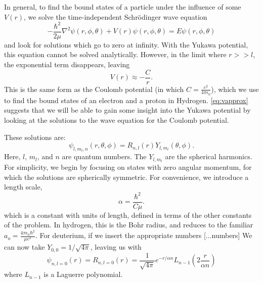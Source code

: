 \documentclass[12pt,twoside]{reedthesis}
\newcommand{\eqn}[1]{\begin{equation}#1\end{equation}}
\begin{document}
In general, to find the bound states of a particle under the influence of some $V(r)$, we solve the time-independent Schr\"odinger wave equation
\eqn{
-\frac{\hbar^2}{2\mu}\nabla^2\psi(r,\phi,\theta) + V(r)\psi (r,\phi,\theta) = E \psi(r,\phi,\theta)
\label{eq:TIDSWE-general}
} and look for solutions which go to zero at infinity.
With the Yukawa potential, this equation cannot be solved analytically. However, in the limit where $r >> l$, the exponential term disappears, leaving
\eqn{
V(r) \approx -\frac{C}{r}\mbox{.}
\label{eq:vapprox}
}
This is the same form as the Coulomb potential (in which $C = \frac{e^2}{4\pi\epsilon_0}$), which we use to find the bound states of an electron and a proton in Hydrogen. \eqref{eq:vapprox} suggests that we will be able to gain some insight into the Yukawa potential by looking at the solutions to the wave equation for the Coulomb potential. 

These solutions are:
\eqn{
\psi_{l, m_l, n} (r, \theta, \phi) = R_{n,l}(r) Y_{l,m_l}(\theta,\phi)\mbox{.}
}
Here, $l$, $m_l$, and $n$ are quantum numbers. The $Y_{l, m_l}$ are the spherical harmonics. For simplicity, we begin by focusing on states with zero angular momentum, for which the solutions are spherically symmetric.
For convenience, we introduce a length scale, 
\eqn{
\alpha = \frac{\hbar^2}{C \mu}\mbox{.}
\label{eq:bohrradius}
}
which is a constant with units of length, defined in terms of the other constants of the problem. 
In hydrogen, this is the Bohr radius, and reduces to the familiar $a_o = \frac{4\pi \epsilon_0 \hbar^2}{\mu e^2}$. For deuterium, if we insert the appropriate numbers [...numbers] 
We can now take $Y_{0,0} = 1/\sqrt{4 \pi}$, leaving us with
\eqn{
\psi_{n, l =0}(r) = R_{n , l= 0}(r) = \frac{1}{\sqrt{4\pi}} e^{-r /\alpha n}L_{n-1} \left(2\frac{r}{ \alpha n}\right)
\label{eq:SWE-coulomb}
}
where $L_{n-1}$ is a Laguerre polynomial. 
\end{document}
